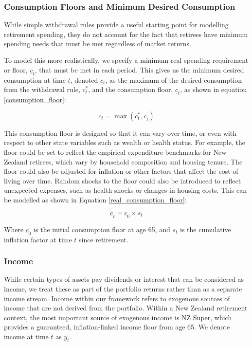 \documentclass[11pt]{article}
\begin{document}
\subsubsection{Consumption Floors and Minimum Desired Consumption}

While simple withdrawal rules provide a useful starting point for modelling retirement spending, they do not account for the fact that retirees have minimum spending needs that must be met regardless of market returns. 

To model this more realistically, we specify a minimum real spending requirement or floor, \(\underline{c}_t\), that must be met in each period. This gives us the minimum desired consumption at time \(t\), denoted \(c_t\), as the maximum of the desired consumption from the withdrawal rule, \(c^*_t\), and the consumption floor, \(\underline{c}_t\), as shown in equation \ref{consumption_floor}:

\begin{equation}\label{consumption_floor}
c_t = \max\left(c^*_t, \underline{c}_t\right)
\end{equation}

This consumption floor is designed so that it can vary over time, or even with respect to other state variables such as wealth or health status. For example, the floor could be set to reflect the empirical expenditure benchmarks for New Zealand retirees, which vary by household composition and housing tenure. The floor could also be adjusted for inflation or other factors that affect the cost of living over time. Random shocks to the floor could also be introduced to reflect unexpected expenses, such as health shocks or changes in housing costs. This can be modelled as shown in Equation \ref{real_consumption_floor}:

\begin{equation}\label{real_consumption_floor}
  \underline{c}_t = \underline{c}_0 \times s_t
\end{equation}

Where \(\underline{c}_0\) is the initial consumption floor at age 65, and \(s_t\) is the cumulative inflation factor at time \(t\) since retirement. 


\subsubsection{Income}

While certain types of assets pay dividends or interest that can be considered as income, we treat these as part of the portfolio returns rather than as a separate income stream. Income within our framework refers to exogenous sources of income that are not derived from the portfolio. Within a New Zealand retirement context, the most important source of exogenous income is NZ Super, which provides a guaranteed, inflation-linked income floor from age 65. We denote income at time \(t\) as \(y_t\). 
\end{document}
